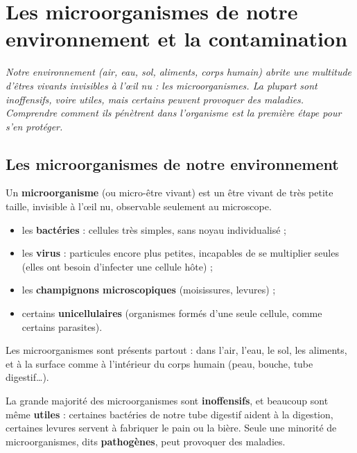 \chapter{Les microorganismes de notre environnement et la contamination}

\noindent\textit{Notre environnement (air, eau, sol, aliments, corps humain) abrite une
multitude d'êtres vivants invisibles à l'œil nu : les microorganismes. La plupart sont
inoffensifs, voire utiles, mais certains peuvent provoquer des maladies. Comprendre
comment ils pénètrent dans l'organisme est la première étape pour s'en protéger.}
\vspace{8pt}

\connecteBanner

\section{Les microorganismes de notre environnement}

\begin{definition}[Microorganisme]
Un \textbf{microorganisme} (ou micro-être vivant) est un être vivant de très petite
taille, invisible à l'œil nu, observable seulement au microscope.
\end{definition}

\begin{propriete}
\begin{itemize}
\item les \textbf{bactéries} : cellules très simples, sans noyau individualisé ;
\item les \textbf{virus} : particules encore plus petites, incapables de se
multiplier seules (elles ont besoin d'infecter une cellule hôte) ;
\item les \textbf{champignons microscopiques} (moisissures, levures) ;
\item certains \textbf{unicellulaires} (organismes formés d'une seule cellule, comme
certains parasites).
\end{itemize}
\end{propriete}

\begin{propriete}
Les microorganismes sont présents partout : dans l'air, l'eau, le sol, les aliments, et
à la surface comme à l'intérieur du corps humain (peau, bouche, tube digestif\dots).
\end{propriete}

\begin{remarque}
La grande majorité des microorganismes sont \textbf{inoffensifs}, et beaucoup sont même
\textbf{utiles} : certaines bactéries de notre tube digestif aident à la digestion,
certaines levures servent à fabriquer le pain ou la bière. Seule une minorité de
microorganismes, dits \textbf{pathogènes}, peut provoquer des maladies.
\end{remarque}

